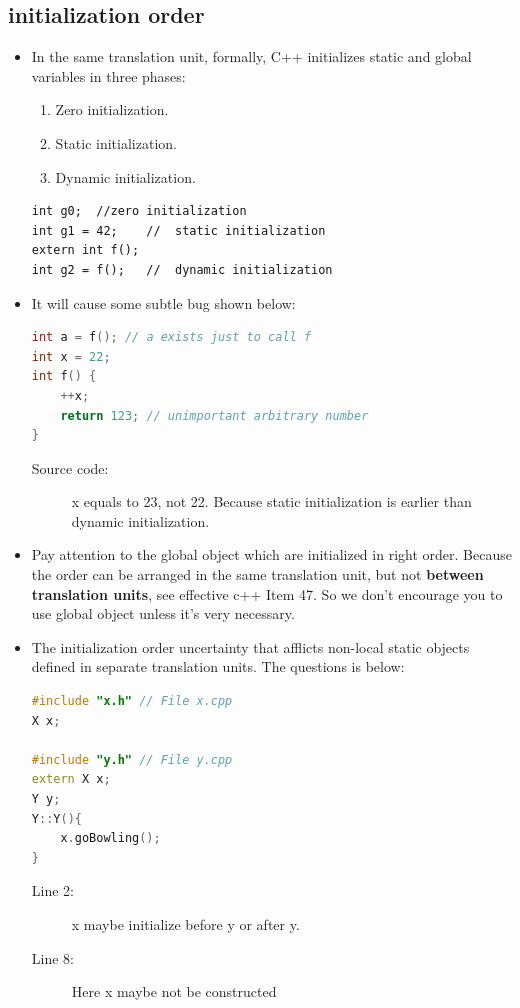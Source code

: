 \documentclass[a4paper,11pt,twoside]{book}
\begin{document}
\subsection{initialization order}
\begin{itemize}
	\item In the same translation unit, formally, C++ initializes static and global variables in three phases:
	\begin{enumerate}
		\item Zero initialization.
		\item Static initialization.
		\item Dynamic initialization.
	\end{enumerate}
	
\begin{lstlisting}[numbers=none]
int g0;  //zero initialization
int g1 = 42;    //  static initialization
extern int f();
int g2 = f();   //  dynamic initialization
\end{lstlisting}
	\item It will cause some subtle bug shown below:
\begin{lstlisting}[frame=single, language=c++, mathescape=true]
int a = f(); // a exists just to call f
int x = 22;
int f() {
	++x;
	return 123; // unimportant arbitrary number
}
\end{lstlisting}
\begin{description}
	\item[Source code:] x equals to 23, not 22. Because static initialization is earlier than dynamic initialization.
\end{description}
	
	\item Pay attention to the global object which are initialized in right order. Because the order can be arranged in the same translation unit, but not \textbf{between translation units}, see effective c++ Item 47. So we don't encourage you to use global object unless it's very necessary.
	
	\item The initialization order uncertainty that afflicts non-local static objects defined in separate translation units. The questions is below:
	
\begin{lstlisting}[frame=single, language=c++]
#include "x.h" // File x.cpp
X x;
	
#include "y.h" // File y.cpp
extern X x;
Y y;
Y::Y(){ 
	x.goBowling();
}
\end{lstlisting}
\begin{description}
	\item[Line 2:] x maybe initialize before y or after y.
	\item[Line 8:] Here x maybe not be constructed
\end{description}
	

\end{itemize}
\end{document}
